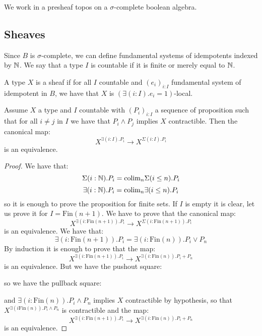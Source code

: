 We work in a presheaf topos on a $\sigma$-complete boolean algebra.


\subsection{Sheaves}

Since $B$ is $\sigma$-complete, we can define fundamental systems of idempotents indexed by $\mathbb{N}$. We say that a type $I$ is countable if it is finite or merely equal to $\mathbb{N}$.

\begin{definition}
A type $X$ is a sheaf if for all $I$ countable and $(e_i)_{i:I}$ fundamental system of idempotent in $B$, we have that $X$ is $(\exists (i:I). e_i=1)$-local.
\end{definition}

\begin{lemma}\label{countable-cover-cech}
Assume $X$ a type and $I$ countable with $(P_i)_{i:I}$ a sequence of proposition such that for all $i\not=j$ in $I$ we have that $P_i\land P_j$ implies $X$ contractible. Then the canonical map:
\[X^{\exists(i:I). P_i} \to X^{\Sigma(i:I).P_i}  \]
is an equivalence.
\end{lemma}

\begin{proof}
We have that:
\[ \Sigma(i:\mathbb{N}). P_i = \mathrm{colim}_n \Sigma(i\leq n). P_i\]
\[ \exists(i:\mathbb{N}). P_i = \mathrm{colim}_n \exists(i\leq n). P_i\]
so it is enough to prove the proposition for finite sets. If $I$ is empty it is clear, let us prove it for $I=\mathrm{Fin}(n+1)$. We have to prove that the canonical map: 
\[X^{\exists(i:\mathrm{Fin}(n+1)). P_i}\to X^{\Sigma(i : \mathrm{Fin}(n+1)). P_i}\]
is an equivalence. We have that:
\[\exists(i: \mathrm{Fin}(n+1)). P_i = \exists(i:\mathrm{Fin}(n)). P_i \lor P_{n}\]
By induction it is enough to prove that the map:
\[X^{\exists(i:\mathrm{Fin}(n+1)). P_i} \to X^{\exists(i:\mathrm{Fin}(n)).P_i + P_{n}}\]
is an equivalence. But we have the pushout square:
\begin{center}
\end{center}
so we have the pullback square:
\begin{center}
\end{center}
and $\exists(i:\mathrm{Fin}(n)).P_i  \land P_{n}$ implies $X$ contractible by hypothesis, so that $X^{\exists(i\mathrm{Fin}(n)).P_i  \land P_{n}}$ is contractible and the map:
\[X^{\exists(i:\mathrm{Fin}(n+1)). P_i} \to X^{\exists(i:\mathrm{Fin}(n)).P_i + P_{n}}\]
is an equivalence.
\end{proof}

